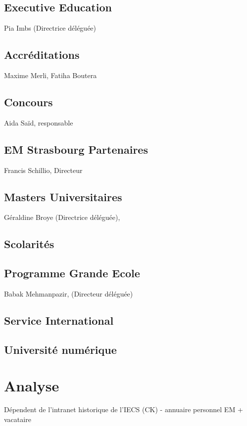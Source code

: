 \documentclass{book}
\begin{document}
\section{Executive Education }
Pia Imbs (Directrice déléguée)

\section{Accréditations}
Maxime Merli, Fatiha Boutera

\section{Concours }
Aida Saïd, responsable

\section{EM Strasbourg Partenaires }
Francis Schillio, Directeur 

\section{Masters Universitaires}
Géraldine Broye (Directrice déléguée),

 
\section{Scolarités}

\section{Programme Grande Ecole}
Babak Mehmanpazir, (Directeur déléguée)

\section{Service International}

\section{Université numérique}



\chapter{Analyse}


Dépendent de l'intranet historique de l'IECS (CK)
- annuaire personnel EM + vacataire




\appendix
%
\printindex
\end{document}
